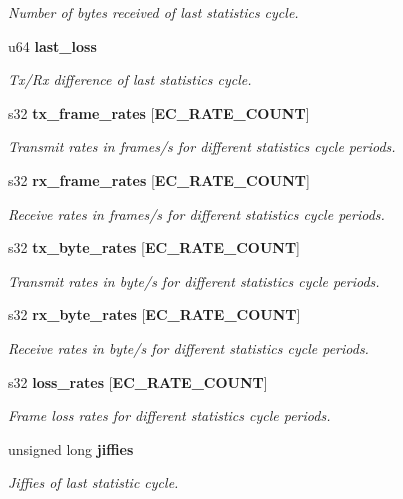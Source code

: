 \begin{DoxyCompactItemize}
\begin{DoxyCompactList}\small\item\em Number of bytes received of last statistics cycle. \end{DoxyCompactList}\item 
u64 {\bf last\-\_\-loss}
\begin{DoxyCompactList}\small\item\em Tx/\-Rx difference of last statistics cycle. \end{DoxyCompactList}\item 
s32 {\bf tx\-\_\-frame\-\_\-rates} [{\bf E\-C\-\_\-\-R\-A\-T\-E\-\_\-\-C\-O\-U\-N\-T}]\label{structec__device__stats__t_ae7ca9495a2d4254d7cb87655a1e5ea64}

\begin{DoxyCompactList}\small\item\em Transmit rates in frames/s for different statistics cycle periods. \end{DoxyCompactList}\item 
s32 {\bf rx\-\_\-frame\-\_\-rates} [{\bf E\-C\-\_\-\-R\-A\-T\-E\-\_\-\-C\-O\-U\-N\-T}]\label{structec__device__stats__t_a71c364775c6e39faf856d6569f4ac384}

\begin{DoxyCompactList}\small\item\em Receive rates in frames/s for different statistics cycle periods. \end{DoxyCompactList}\item 
s32 {\bf tx\-\_\-byte\-\_\-rates} [{\bf E\-C\-\_\-\-R\-A\-T\-E\-\_\-\-C\-O\-U\-N\-T}]
\begin{DoxyCompactList}\small\item\em Transmit rates in byte/s for different statistics cycle periods. \end{DoxyCompactList}\item 
s32 {\bf rx\-\_\-byte\-\_\-rates} [{\bf E\-C\-\_\-\-R\-A\-T\-E\-\_\-\-C\-O\-U\-N\-T}]
\begin{DoxyCompactList}\small\item\em Receive rates in byte/s for different statistics cycle periods. \end{DoxyCompactList}\item 
s32 {\bf loss\-\_\-rates} [{\bf E\-C\-\_\-\-R\-A\-T\-E\-\_\-\-C\-O\-U\-N\-T}]
\begin{DoxyCompactList}\small\item\em Frame loss rates for different statistics cycle periods. \end{DoxyCompactList}\item 
unsigned long {\bf jiffies}
\begin{DoxyCompactList}\small\item\em Jiffies of last statistic cycle. \end{DoxyCompactList}\end{DoxyCompactItemize}


